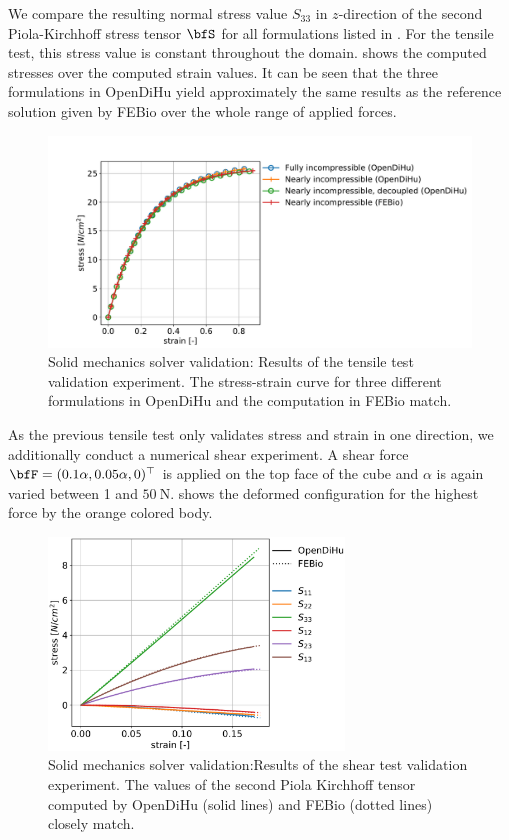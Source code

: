 We compare the resulting normal stress value $S_{33}$ in $z$-direction of the second Piola-Kirchhoff stress tensor $\bfS$ for all formulations listed in . For the tensile test, this stress value is constant throughout the domain.  shows the computed stresses over the computed strain values.
It can be seen that the three formulations in OpenDiHu yield approximately the same results as the reference solution given by FEBio over the whole range of applied forces.

\begin{figure}
  \centering%
  \includegraphics[width=\textwidth]{images/results/basic/validation_tensile_test.pdf}%
  \caption{Solid mechanics solver validation: Results of the tensile test validation experiment. The stress-strain curve for three different formulations in OpenDiHu and the computation in FEBio match.}%
  \label{fig:validation_tensile_test}%
\end{figure}

As the previous tensile test only validates stress and strain in one direction, we additionally conduct a numerical shear experiment. A shear force $\bfF=(0.1\alpha, 0.05\alpha, 0)^\top$ is applied on the top face of the cube and $\alpha$ is again varied between 1 and $\SI{50}{\newton}$.  shows the deformed configuration for the highest force by the orange colored body.

\begin{figure}
  \centering%
  \includegraphics[width=0.7\textwidth]{images/results/basic/validation_shear_test.pdf}%
  \caption{Solid mechanics solver validation:Results of the shear test validation experiment. The values of the second Piola Kirchhoff tensor computed by OpenDiHu (solid lines) and FEBio (dotted lines) closely match.}%
  \label{fig:validation_shear_test}%
\end{figure}

